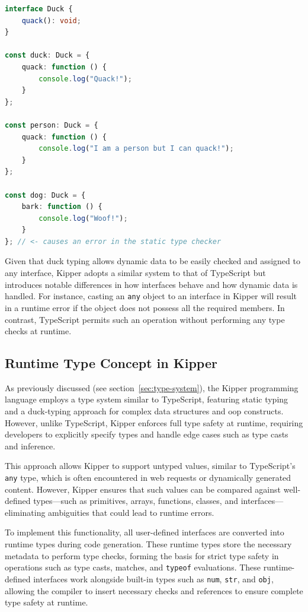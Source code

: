 \begin{lstlisting}[language=Typescript,caption=Example of duck typing in TypeScript,label=lst:implementation:javascriptducktyping]
interface Duck {
	quack(): void;
}

const duck: Duck = {
	quack: function () {
		console.log("Quack!");
	}
};

const person: Duck = {
	quack: function () {
		console.log("I am a person but I can quack!");
	}
};

const dog: Duck = {
	bark: function () {
		console.log("Woof!");
	}
}; // <- causes an error in the static type checker
\end{lstlisting}

Given that duck typing allows dynamic data to be easily checked and assigned to any interface, Kipper adopts a similar system to that of TypeScript but introduces notable differences in how interfaces behave and how dynamic data is handled. For instance, casting an \lstinline|any| object to an interface in Kipper will result in a runtime error if the object does not possess all the required members. In contrast, TypeScript permits such an operation without performing any type checks at runtime.

\subsection{Runtime Type Concept in Kipper}

As previously discussed (see section~\ref{sec:type-system}), the Kipper programming language employs a type system similar to TypeScript, featuring static typing and a duck-typing approach for complex data structures and \acrshort{oop} constructs. However, unlike TypeScript, Kipper enforces full type safety at runtime, requiring developers to explicitly specify types and handle edge cases such as type casts and inference.

This approach allows Kipper to support untyped values, similar to TypeScript’s \lstinline|any| type, which is often encountered in web requests or dynamically generated content. However, Kipper ensures that such values can be compared against well-defined types—such as primitives, arrays, functions, classes, and interfaces—eliminating ambiguities that could lead to runtime errors.

To implement this functionality, all user-defined interfaces are converted into runtime types during code generation. These runtime types store the necessary metadata to perform type checks, forming the basis for strict type safety in operations such as type casts, matches, and \lstinline|typeof| evaluations. These runtime-defined interfaces work alongside built-in types such as \lstinline|num|, \lstinline|str|, and \lstinline|obj|, allowing the compiler to insert necessary checks and references to ensure complete type safety at runtime.


